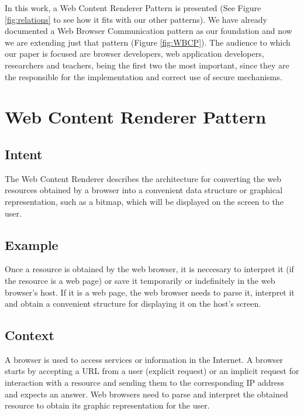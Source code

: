 \documentclass[]{acmlarge}
\begin{document}
In this work, a Web Content Renderer Pattern is presented (See Figure \ref{fig:relations} to see how it fits with our other patterns). We have already documented a Web Browser Communication pattern as our foundation and now we are extending just that pattern \cite{silva2015} (Figure \ref{fig:WBCP}). The audience to which our paper is focused are browser developers, web application developers, researchers and teachers, being the first two the most important, since they are the responsible for the implementation and correct use of secure mechanisms. 


\section{Web Content Renderer Pattern}

  \subsection*{Intent}

  The Web Content Renderer describes the architecture for converting the web resources obtained by a browser into a convenient data structure \cite{gpuchrome} or graphical representation, such as a bitmap, which will be displayed on the screen to the user.

  \subsection*{Example}
  Once a resource is obtained by the web browser, it is neccesary to interpret it (if the resource is a web page) or save it temporarily or indefinitely in the web browser's host. If it is a web page, the web browser needs to parse it, interpret it and obtain a convenient structure for displaying it on the host's screen.
  
  \subsection*{Context}
  A browser is used to access services or information in the Internet. A browser starts by accepting a URL from a user (explicit request) or an implicit request for interaction with a resource and sending them to the corresponding IP address and expects an answer. Web browsers need to parse and interpret the obtained resource to obtain its graphic representation for the user.
\end{document}
